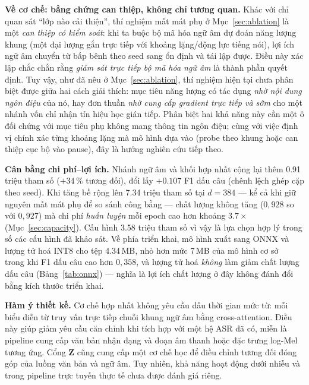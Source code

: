\documentclass[conference,onecolumn]{IEEEtran}
\begin{document}
\textbf{Về cơ chế: bằng chứng can thiệp, không chỉ tương quan.} Khác với chỉ quan
sát ``lớp nào cải thiện'', thí nghiệm mất mát phụ ở Mục~\ref{sec:ablation} là một
\emph{can thiệp có kiểm soát}: khi ta buộc bộ mã hóa ngữ âm dự đoán năng lượng khung
(một đại lượng gắn trực tiếp với khoảng lặng/động lực tiếng nói), lợi ích ngữ âm
chuyển từ bấp bênh theo seed sang ổn định và tái lập được. Điều này xác lập chắc
chắn rằng \emph{giám sát trực tiếp bộ mã hóa ngữ âm} là thành phần quyết định.
Tuy vậy, như đã nêu ở Mục~\ref{sec:ablation}, thí nghiệm hiện tại chưa phân biệt
được giữa hai cách giải thích: mục tiêu năng lượng có tác dụng \emph{nhờ nội dung
ngôn điệu} của nó, hay đơn thuần \emph{nhờ cung cấp gradient trực tiếp và sớm}
cho một nhánh vốn chỉ nhận tín hiệu học gián tiếp. Phân biệt hai khả năng này
cần một ô đối chứng với mục tiêu phụ không mang thông tin ngôn điệu; cùng với
việc định vị chính xác từng khoảng lặng mà mô hình dựa vào (probe theo khung hoặc
can thiệp cục bộ vào pause), đây là hướng nghiên cứu tiếp theo.

\textbf{Cân bằng chi phí--lợi ích.} Nhánh ngữ âm và khối hợp nhất cộng lại thêm
0.91 triệu tham số ($+34\,\%$ tương đối), đổi lấy $+0.107$ F1 dấu câu (chênh lệch
ghép cặp theo seed). Khi tăng bề rộng lên 7.34 triệu tham số tại
$d{=}384$ --- kể cả khi giữ nguyên mất mát phụ để so sánh công bằng --- chất
lượng không tăng ($0{,}928$ so với $0{,}927$) mà chi phí \emph{huấn luyện} mỗi
epoch cao hơn khoảng $3.7\times$ (Mục~\ref{sec:capacity}). Cấu hình 3.58 triệu
tham số vì vậy là lựa chọn hợp lý trong số các cấu hình đã khảo sát. Về phía
triển khai, mô hình xuất sang ONNX và lượng tử hoá INT8 cho tệp 4.34\,MB, nhỏ
hơn mức 7\,MB của mô hình cơ sở~\cite{you2024lightweight} trong khi F1 dấu câu
cao hơn $0{,}358$, và lượng tử hoá \emph{không} làm giảm chất lượng dấu câu
(Bảng~\ref{tab:onnx}) --- nghĩa là lợi ích chất lượng ở đây không đánh đổi bằng
kích thước triển khai.

\textbf{Hàm ý thiết kế.} Cơ chế hợp nhất không yêu cầu dấu thời gian mức từ:
mỗi biểu diễn từ truy vấn trực tiếp chuỗi khung ngữ âm bằng cross-attention. Điều
này giúp giảm yêu cầu căn chỉnh khi tích hợp với một hệ ASR đã có, miễn là pipeline
cung cấp văn bản nhận dạng và đoạn âm thanh hoặc đặc trưng log-Mel tương ứng. Cổng
$\mathbf{Z}$ cũng cung cấp một cơ chế học để điều chỉnh tương đối đóng góp của
luồng văn bản và ngữ âm. Tuy nhiên, khả năng hoạt động dưới nhiễu và trong pipeline
trực tuyến thực tế chưa được đánh giá riêng.
\end{document}
